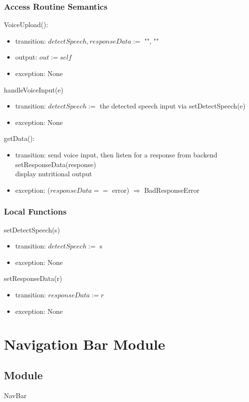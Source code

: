\documentclass[12pt, titlepage]{article}
\begin{document}
\subsubsection{Access Routine Semantics}
\noindent VoiceUpload():
\begin{itemize}
	\item transition: $detectSpeech, responseData :=$ "", ""
	\item output: $out := self$ 
	\item exception: None
\end{itemize}
\noindent handleVoiceInput(e)
\begin{itemize}
	\item transition: $detectSpeech :=$ the detected speech input via 
	setDetectSpeech(e)
	\item exception: None
\end{itemize}
\noindent getData():
\begin{itemize}
	\item transition: send voice input, then listen for a response from 
	backend\\ setResponseData(response)\\ display nutritional output
	\item exception: ($responseData ==$ error) $\Rightarrow$ BadResponseError
\end{itemize}
\subsubsection{Local Functions}
\noindent setDetectSpeech(s)
\begin{itemize}
	\item transition: $ detectSpeech := $ s
	\item exception: None
\end{itemize}
\noindent setResponseData(r)
\begin{itemize}
	\item transition: $ responseData:=r $
	\item exception: None
\end{itemize}

\newpage

\section{Navigation Bar Module} \label{Navbar}
\subsection{Module}
NavBar
\end{document}
